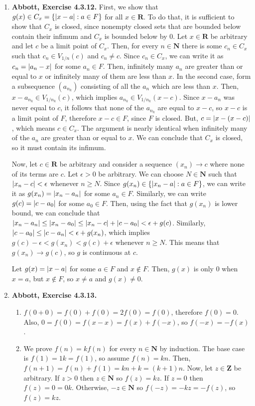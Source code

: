 \documentclass{article}
\DeclarePairedDelimiter\abs{\lvert}{\rvert}
\newcommand{\N}{\mathbf{N}}
\newcommand{\Z}{\mathbf{Z}}
\newcommand{\R}{\mathbf{R}}
\newcommand{\set}[1]{\{#1\}}
\newcommand{\exc}[2][Abbott]{\item \textbf{#1, Exercise #2.}}
\newcommand{\lep}[1][L]{#1et $\epsilon > 0$ be arbitrary}
\begin{document}
\begin{enumerate}
    \exc{4.3.12}
    First, we show that $g(x) \in C_x = \set{\abs{x-a} : a \in F}$ for all $x \in \R$. To do that, it is sufficient to show that $C_x$ is closed, since nonempty closed sets that are bounded below contain their infimum and $C_x$ is bounded below by $0$. Let $x \in \R$ be arbitrary and let $c$ be a limit point of $C_x$. Then, for every $n \in \N$ there is some $c_n \in C_x$ such that $c_n \in V_{1/n}(c)$ and $c_n \neq c$. Since $c_n \in C_x$, we can write it as $c_n = \abs{a_n - x}$ for some $a_n \in F$. Then, infinitely many $a_n$ are greater than or equal to $x$ or infinitely many of them are less than $x$. In the second case, form a subsequence $(a_{n_k})$ consisting of all the $a_n$ which are less than $x$. Then, $x - a_{n_k} \in V_{1/n_k}(c)$, which implies $a_{n_k} \in V_{1/n_k}(x-c)$. Since $x-a_n$ was never equal to $c$, it follows that none of the $a_{n_k}$ are equal to $x-c$, so $x-c$ is a limit point of $F$, therefore $x-c \in F$, since $F$ is closed. But, $c = \abs{x-(x-c)}$, which means $c \in C_x$. The argument is nearly identical when infinitely many of the $a_n$ are greater than or equal to $x$. We can conclude that $C_x$ is closed, so it must contain its infimum.
    
    Now, let $c \in \R$ be arbitrary and consider a sequence $(x_n) \to c$ where none of its terms are $c$. \lep. We can choose $N \in \N$ such that $\abs{x_n-c} < \epsilon$ whenever $n \geq N$. Since $g(x_n) \in \set{\abs{x_n-a} : a \in F}$, we can write it as $g(x_n) = \abs{x_n-a_n}$ for some $a_n \in F$. Similarly, we can write $g(c) = \abs{c-a_0}$ for some $a_0 \in F$. Then, using the fact that $g(x_n)$ is lower bound, we can conclude that $\abs{x_n-a_n} \leq \abs{x_n-a_0} \leq \abs{x_n-c}+\abs{c-a_0} < \epsilon + g(c)$. Similarly, $\abs{c-a_0} \leq \abs{c-a_n} < \epsilon + g(x_n)$, which implies $g(c)-\epsilon < g(x_n) < g(c) + \epsilon$ whenever $n \geq N$. This means that $g(x_n) \to g(c)$, so $g$ is continuous at $c$.
    
    Let $g(x) = \abs{x-a}$ for some $a \in F$ and $x \notin F$. Then, $g(x)$ is only $0$ when $x = a$, but $x \notin F$, so $x \neq a$ and $g(x) \neq 0$.
    
    \exc{4.3.13}
    \begin{enumerate}
        \item $f(0+0) = f(0) + f(0) = 2f(0) = f(0)$, therefore $f(0) = 0$. Also, $0 = f(0) = f(x-x) = f(x) + f(-x)$, so $f(-x) = -f(x)$.
        
        \item We prove $f(n) = k f(n)$ for every $n \in \N$ by induction. The base case is $f(1) = 1 k = f(1)$, so assume $f(n) = k n$. Then, $f(n+1) = f(n) + f(1) = k n + k = (k+1) n$. Now, let $z \in \Z$ be arbitrary. If $z > 0$ then $z \in \N$ so $f(z) = k z$. If $z = 0$ then $f(z) = 0 = 0 k$. Otherwise, $-z \in \N$ so $f(-z) = -k z = -f(z)$, so $f(z) = k z$. 
        

\end{enumerate}
\end{enumerate}
\end{document}
